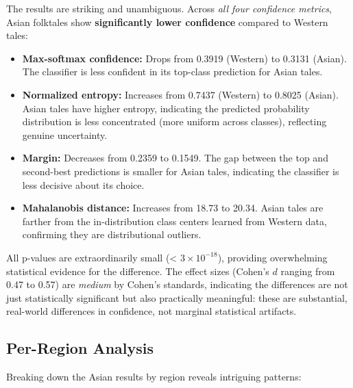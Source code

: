 \documentclass{article}
\begin{document}
The results are striking and unambiguous. Across \textit{all four confidence metrics}, Asian folktales show \textbf{significantly lower confidence} compared to Western tales:

\begin{itemize}
\item \textbf{Max-softmax confidence:} Drops from 0.3919 (Western) to 0.3131 (Asian). The classifier is less confident in its top-class prediction for Asian tales.
\item \textbf{Normalized entropy:} Increases from 0.7437 (Western) to 0.8025 (Asian). Asian tales have higher entropy, indicating the predicted probability distribution is less concentrated (more uniform across classes), reflecting genuine uncertainty.
\item \textbf{Margin:} Decreases from 0.2359 to 0.1549. The gap between the top and second-best predictions is smaller for Asian tales, indicating the classifier is less decisive about its choice.
\item \textbf{Mahalanobis distance:} Increases from 18.73 to 20.34. Asian tales are farther from the in-distribution class centers learned from Western data, confirming they are distributional outliers.
\end{itemize}

All p-values are extraordinarily small (< $3 \times 10^{-18}$), providing overwhelming statistical evidence for the difference. The effect sizes (Cohen's $d$ ranging from 0.47 to 0.57) are \textit{medium} by Cohen's standards, indicating the differences are not just statistically significant but also practically meaningful: these are substantial, real-world differences in confidence, not marginal statistical artifacts.

\subsection{Per-Region Analysis}

Breaking down the Asian results by region reveals intriguing patterns:
\end{document}
